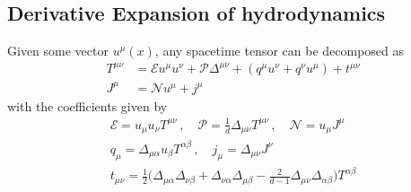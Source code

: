 
\subsection{Derivative Expansion of hydrodynamics \cite{Kovtun_2012}}

Given some vector $u^\mu(x)$, any spacetime tensor can be decomposed as
\begin{subequations}
    \begin{align}
        T^{\mu\nu} & =\mathcal{E} u^\mu u^\nu+\mathcal{P}\Delta^{\mu\nu}+(q^\mu u^\nu+q^\nu u^\mu)+t^{\mu\nu}\label{eq:FluidMechanics_EnMomTens_Decomposition} \\
        J^\mu      & =\mathcal{N}u^\mu+j^\mu\label{eq:FluidMechanics_Vector_Decomposition}
    \end{align}
    \label{eq:FluidMechanics_Tensor_Decomposition}
\end{subequations}
with the coefficients given by
\begin{subequations}
    \begin{gather}
        \mathcal{E}=u_\mu u_\nu T^{\mu\nu}\,,\quad \mathcal{P}=\frac{1}{d}\Delta_{\mu\nu}T^{\mu\nu}\,,\quad \mathcal{N}=u_\mu J^\mu\\
        q_\mu=\Delta_{\mu\alpha}u_\beta T^{\alpha\beta}\,,\quad j_\mu=\Delta_{\mu\nu}J^\nu\\
        t_{\mu\nu}=\frac{1}{2}\Big(\Delta_{\mu\alpha}\Delta_{\nu\beta}+\Delta_{\nu\alpha}\Delta_{\mu\beta}-\frac{2}{d-1}\Delta_{\mu\nu}\Delta_{\alpha\beta}\Big)T^{\alpha\beta}
    \end{gather}
    \label{eq:FluidMechanics_Tensor_DecompositionCoefficients}
\end{subequations}

